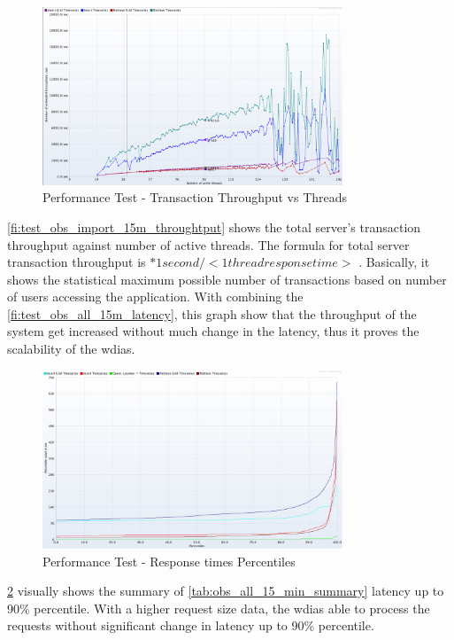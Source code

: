 \begin{figure}[htp]
    \centering
    \includegraphics[width=0.8\textwidth]{results/obs/all/obs_all_15m_transaction_throughtput_vs_threads.png}
    \caption{Performance Test - Transaction Throughput vs Threads}
    \label{fi:test_obs_all_15m_throughtput}
\end{figure}
\ref{fi:test_obs_import_15m_throughtput} shows the total server's transaction throughput against number of active threads.
The formula for total server transaction throughput is \(<active threads> * 1 second / <1  thread response time>\) \cite{JMeterPluginsDocumentationJMeter-Plugins.org}. Basically, it shows the statistical maximum possible number of transactions based on number of users accessing the application.
With combining the \ref{fi:test_obs_all_15m_latency}, this graph show that the throughput of the system get increased without much change in the latency, thus it proves the scalability of the \acrshort{wdias}.

\begin{figure}[htp]
    \centering
    \includegraphics[width=0.8\textwidth]{results/obs/all/obs_all_15m_response_times_percentiles.png}
    \caption{Performance Test - Response times Percentiles}
    \label{fi:test_obs_all_15m_latency_percentile}
\end{figure}
\ref{fi:test_obs_all_15m_latency_percentile} visually shows the summary of \ref{tab:obs_all_15_min_summary} latency up to 90\% percentile. With a higher request size data, the \acrshort{wdias} able to process the requests without significant change in latency up to 90\% percentile.



